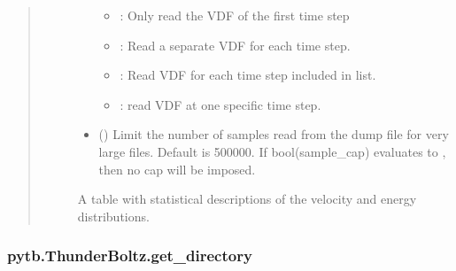 \documentclass[letterpaper,10pt,english,openany,oneside]{sphinxmanual}
\begin{document}
\begin{fulllineitems}
\begin{fulllineitems}
\begin{quote}
\begin{description}
\begin{itemize}
\begin{itemize}
\item {} 
\sphinxAtStartPar
{}: Only read the VDF of the first time step

\item {} 
\sphinxAtStartPar
{}: Read a separate VDF for each time step.

\item {} 
\sphinxAtStartPar
{}: Read VDF for each time step included in list.

\item {} 
\sphinxAtStartPar
{}: read VDF at one specific time step.

\end{itemize}


\item {} 
\sphinxAtStartPar
{} () \textendash{} Limit the number of samples read from the dump
file for very large files. Default is 500000. If bool(sample\_cap)
evaluates to , then no cap will be imposed.

\end{itemize}

\sphinxAtStartPar
A table with statistical descriptions of
the velocity and energy distributions.

\sphinxAtStartPar
{}

\end{description}\end{quote}

\end{fulllineitems}


\sphinxstepscope


\subsubsection{pytb.ThunderBoltz.get\_directory}
\label{\detokenize{api/pytb.ThunderBoltz.get_directory:pytb-thunderboltz-get-directory}}\label{\detokenize{api/pytb.ThunderBoltz.get_directory::doc}}


\end{fulllineitems}
\end{document}
